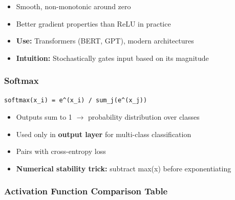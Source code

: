 \documentclass[11pt]{article}
\providecommand{\tightlist}{\setlength{\itemsep}{1pt}\setlength{\parskip}{0pt}}
\begin{document}
\begin{itemize}
\tightlist
\item
  Smooth, non-monotonic around zero
\item
  Better gradient properties than ReLU in practice
\item
  \textbf{Use:} Transformers (BERT, GPT), modern architectures
\item
  \textbf{Intuition:} Stochastically gates input based on its magnitude
\end{itemize}

\subsubsection{Softmax}\label{softmax}

\setcodelang{}

\begin{verbatim}
softmax(x_i) = e^(x_i) / sum_j(e^(x_j))
\end{verbatim}

\begin{itemize}
\tightlist
\item
  Outputs sum to 1 \(\rightarrow\) probability distribution over classes
\item
  Used only in \textbf{output layer} for multi-class classification
\item
  Pairs with cross-entropy loss
\item
  \textbf{Numerical stability trick:} subtract max(x) before exponentiating
\end{itemize}

\subsubsection{Activation Function Comparison Table}\label{activation-function-comparison-table}
\end{document}
